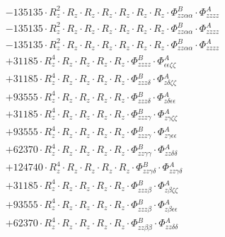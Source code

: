 \documentclass{article}
\begin{document}
\begin{subequations}
\begin{gather}
\begin{array}{c}
 \\[0.2em] 		 - 135135 \cdot R_{z}^{2} \cdot R_{z} \cdot R_{z} \cdot R_{z} \cdot R_{z} \cdot R_{z} \cdot R_{z} \cdot \Phi{}^{B}_{zz\alpha{}\alpha{}} \cdot \Phi{}^{A}_{zzzz} 
 \\[0.2em] 		 - 135135 \cdot R_{z}^{2} \cdot R_{z} \cdot R_{z} \cdot R_{z} \cdot R_{z} \cdot R_{z} \cdot R_{z} \cdot \Phi{}^{B}_{zz\alpha{}\alpha{}} \cdot \Phi{}^{A}_{zzzz} 
 \\[0.2em] 		 - 135135 \cdot R_{z}^{2} \cdot R_{z} \cdot R_{z} \cdot R_{z} \cdot R_{z} \cdot R_{z} \cdot R_{z} \cdot \Phi{}^{B}_{zz\alpha{}\alpha{}} \cdot \Phi{}^{A}_{zzzz} 
 \\[0.2em] 		 + 31185 \cdot R_{z}^{4} \cdot R_{z} \cdot R_{z} \cdot R_{z} \cdot R_{z} \cdot \Phi{}^{B}_{zzzz} \cdot \Phi{}^{A}_{\epsilon{}\epsilon{}\zeta{}\zeta{}} 
 \\[0.2em] 		 + 31185 \cdot R_{z}^{4} \cdot R_{z} \cdot R_{z} \cdot R_{z} \cdot R_{z} \cdot \Phi{}^{B}_{zzz\delta{}} \cdot \Phi{}^{A}_{z\delta{}\zeta{}\zeta{}} 
 \\[0.2em] 		 + 93555 \cdot R_{z}^{4} \cdot R_{z} \cdot R_{z} \cdot R_{z} \cdot R_{z} \cdot \Phi{}^{B}_{zzz\delta{}} \cdot \Phi{}^{A}_{z\delta{}\epsilon{}\epsilon{}} 
 \\[0.2em] 		 + 31185 \cdot R_{z}^{4} \cdot R_{z} \cdot R_{z} \cdot R_{z} \cdot R_{z} \cdot \Phi{}^{B}_{zzz\gamma{}} \cdot \Phi{}^{A}_{z\gamma{}\zeta{}\zeta{}} 
 \\[0.2em] 		 + 93555 \cdot R_{z}^{4} \cdot R_{z} \cdot R_{z} \cdot R_{z} \cdot R_{z} \cdot \Phi{}^{B}_{zzz\gamma{}} \cdot \Phi{}^{A}_{z\gamma{}\epsilon{}\epsilon{}} 
 \\[0.2em] 		 + 62370 \cdot R_{z}^{4} \cdot R_{z} \cdot R_{z} \cdot R_{z} \cdot R_{z} \cdot \Phi{}^{B}_{zz\gamma{}\gamma{}} \cdot \Phi{}^{A}_{zz\delta{}\delta{}} 
 \\[0.2em] 		 + 124740 \cdot R_{z}^{4} \cdot R_{z} \cdot R_{z} \cdot R_{z} \cdot R_{z} \cdot \Phi{}^{B}_{zz\gamma{}\delta{}} \cdot \Phi{}^{A}_{zz\gamma{}\delta{}} 
 \\[0.2em] 		 + 31185 \cdot R_{z}^{4} \cdot R_{z} \cdot R_{z} \cdot R_{z} \cdot R_{z} \cdot \Phi{}^{B}_{zzz\beta{}} \cdot \Phi{}^{A}_{z\beta{}\zeta{}\zeta{}} 
 \\[0.2em] 		 + 93555 \cdot R_{z}^{4} \cdot R_{z} \cdot R_{z} \cdot R_{z} \cdot R_{z} \cdot \Phi{}^{B}_{zzz\beta{}} \cdot \Phi{}^{A}_{z\beta{}\epsilon{}\epsilon{}} 
 \\[0.2em] 		 + 62370 \cdot R_{z}^{4} \cdot R_{z} \cdot R_{z} \cdot R_{z} \cdot R_{z} \cdot \Phi{}^{B}_{zz\beta{}\beta{}} \cdot \Phi{}^{A}_{zz\delta{}\delta{}} 

\end{array}
\end{gather}
\end{subequations}
\end{document}
